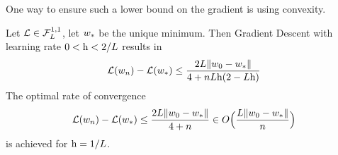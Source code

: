 One way to ensure such a lower bound on the gradient is using convexity.

\begin{theorem}
	\label{thm: convex function GD loss upper bound}
	Let \(\mathcal{L}\in\mathcal{F}^{1,1}_{L}\), let \(w_*\) be the unique minimum.
	Then Gradient Descent with learning rate \(0 < \text{h} < 2/L\) results in
	\begin{align}\label{eq: convex function loss upper bound}
		\mathcal{L}(w_n) - \mathcal{L}(w_*)
		\le \frac{2L\|w_0 - w_*\|}{4 + nL\text{h}(2-L\text{h})}
	\end{align}
	The optimal rate of convergence 
	\begin{align*}
		\mathcal{L}(w_n) - \mathcal{L}(w_*)
		\le \frac{2L\|w_0-w_*\|}{4+n}
		\in O\Big(\frac{L\|w_0-w_*\|}{n}\Big)
	\end{align*}
	is achieved for \(\text{h}=1/L\).
\end{theorem}
